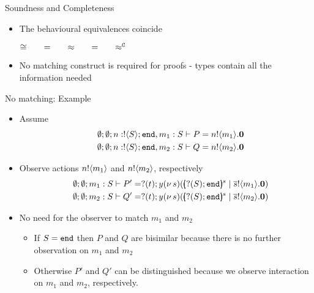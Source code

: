 \documentclass{beamer}
\begin{document}
	\begin{frame}{Soundness and Completeness}
		\begin{itemize}
			\item	The behavioural equivalences coincide

				\begin{theorem}
					\begin{center}
					$\cong \qquad =\qquad \approx \qquad =\qquad \approx^\mathtt{C}$
					\end{center}
				\end{theorem}

			\item	No matching construct is required for proofs - types contain all the information needed

		\end{itemize}
	\end{frame}

	\begin{frame}{No matching: Example}
			\begin{itemize}
				\item	Assume
					\begin{eqnarray*}
						&&\emptyset; \emptyset; n: ! \langle S \rangle ; \mathtt{end}, m_1 : S \vdash P = n ! \langle m_1 \rangle . \mathbf{0} \\
						&&\emptyset; \emptyset; n: ! \langle S \rangle ; \mathtt{end}, m_2 : S \vdash Q = n ! \langle m_2 \rangle . \mathbf{0}
					\end{eqnarray*}
				\item	Observe actions $n ! \langle m_1 \rangle$ and $n ! \langle m_2 \rangle$, respectively
					\begin{eqnarray*}
						&&\es; \es; m_1 : S \proves P' = \btinp{t}{y} \newsp{s}{\mapchar{\btinp{S} \tinact}{s}\Par \bout{\dual{s}}{m_1}\inact} \\
						&&\es; \es; m_2 : S \proves Q' = \btinp{t}{y} \newsp{s}{\mapchar{\btinp{S} \tinact}{s}\Par \bout{\dual{s}}{m_2}\inact} 
					\end{eqnarray*}


				\item	No need for the observer to match $m_1$ and $m_2$
				\begin{itemize}
					\item	If $S = \mathtt{end}$ then $P$ and $Q$ are bisimilar because there is no further observation on $m_1$ and $m_2$
					\item	Otherwise $P'$ and $Q'$ can be distinguished because we observe interaction on $m_1$ and $m_2$,
						respectively.
				\end{itemize}
			\end{itemize}
	\end{frame}
\end{document}
